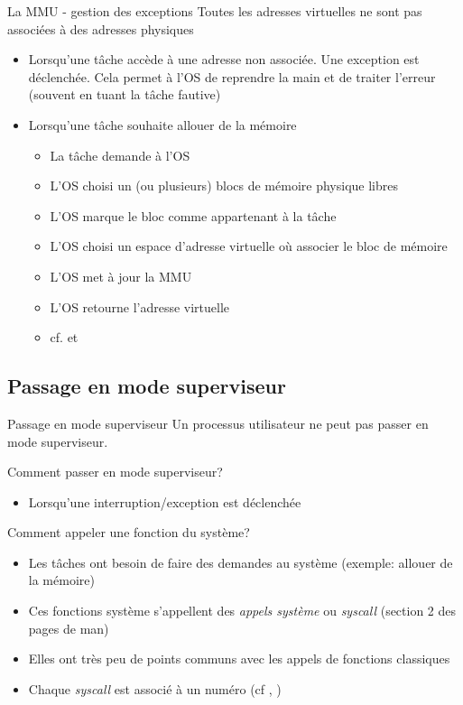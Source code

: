 \begin{frame}{La MMU - gestion des exceptions}
  Toutes  les  adresses  virtuelles  ne  sont  pas  associées  à  des
  adresses physiques
  \begin{itemize}
  \item  Lorsqu'une tâche  accède à  une adresse  non  associée.  Une
    exception est déclenchée.  Cela permet à l'OS de reprendre la main
    et de traiter l'erreur (souvent en tuant la tâche fautive)
  \item Lorsqu'une tâche souhaite allouer de la mémoire
    \begin{itemize}
    \item  La tâche demande à l'OS
    \item  L'OS choisi  un (ou  plusieurs) blocs  de  mémoire physique
      libres
    \item L'OS marque le bloc comme appartenant à la tâche
    \item  L'OS choisi un  espace d'adresse  virtuelle où  associer le
      bloc de mémoire
    \item L'OS met à jour la MMU
    \item L'OS retourne l'adresse virtuelle
    \item cf.  et 
    \end{itemize}
  \end{itemize}
\end{frame}

\subsection {Passage en mode superviseur}

\begin{frame}{Passage en mode superviseur}
  Un processus utilisateur ne peut pas passer en mode superviseur.

  Comment passer en mode superviseur?
  \begin{itemize}
  \item Lorsqu'une interruption/exception est déclenchée
  \end{itemize}

  Comment appeler une fonction du système?
  \begin{itemize}
  \item  Les  tâches ont  besoin  de  faire  des demandes  au  système
    (exemple: allouer de la mémoire)
  \item Ces fonctions système s'appellent des \emph{appels système} ou
    \emph{syscall} (section 2 des pages de man)
  \item  Elles ont  très  peu de  points  communs avec  les appels  de
    fonctions classiques
  \item   Chaque  \emph{syscall}   est   associé  à   un  numéro   (cf
     , )
  \end{itemize}

\end{frame}

